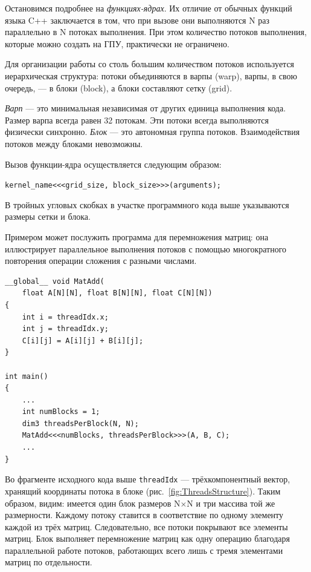 Остановимся подробнее на \textit{функциях-ядрах}. Их отличие от обычных
функций языка C++ заключается в том, что при вызове они выполняются N раз
параллельно в N потоках выполнения. При этом количество потоков выполнения, которые можно создать на ГПУ, практически не ограничено.

Для организации работы со столь большим количеством потоков используется иерархическая структура: потоки объединяются в варпы (warp), варпы, в
свою очередь, --- в блоки (block), а блоки составляют сетку (grid).

\textit{Варп} --- это минимальная независимая от других единица выполнения кода. Размер варпа всегда равен 32 потокам. Эти потоки всегда выполняются физически синхронно. \textit{Блок} --- это автономная группа потоков. Взаимодействия
потоков между блоками невозможны.


Вызов функции-ядра осуществляется следующим образом:

\texttt{kernel\_name<{<}<grid\_size, block\_size>{>}>(arguments);}

В тройных угловых скобках в участке программного кода выше указываются размеры сетки и блока.

Примером может послужить программа для перемножения матриц: она
иллюстрирует параллельное выполнения потоков с помощью многократного
повторения операции сложения с разными числами.

\begin{lstlisting}
__global__ void MatAdd(
	float A[N][N], float B[N][N], float C[N][N])
{
	int i = threadIdx.x;
	int j = threadIdx.y;
	C[i][j] = A[i][j] + B[i][j];
}

int main()
{
	...
	int numBlocks = 1;
	dim3 threadsPerBlock(N, N);
	MatAdd<<<numBlocks, threadsPerBlock>>>(A, B, C);
	...
}
\end{lstlisting}

Во фрагменте исходного кода выше \texttt{threadIdx} --- трёхкомпонентный вектор, хранящий координаты потока в блоке (рис.~\ref{fig:ThreadsStructure}). Таким образом, видим: имеется один блок размеров N$ \times $N и три массива той же размерности. Каждому потоку ставится в соответствие по одному элементу каждой из трёх матриц. Следовательно, все потоки покрывают все элементы матриц. Блок выполняет перемножение матриц как одну операцию благодаря параллельной работе потоков, работающих всего лишь с тремя элементами матриц по отдельности.

